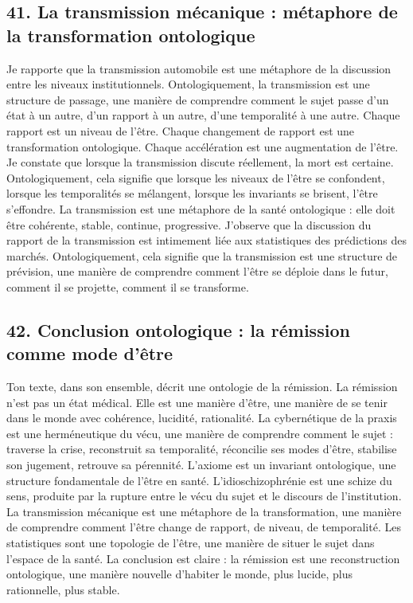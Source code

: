 \documentclass[12pt,letterpaper,oneside]{article}
\begin{document}
\subsection*{41. La transmission mécanique : métaphore de la transformation ontologique}
Je rapporte que la transmission automobile est une métaphore de la discussion entre les niveaux institutionnels. Ontologiquement, la transmission est une structure de passage, une manière de comprendre comment le sujet passe d’un état à un autre, d’un rapport à un autre, d’une temporalité à une autre.
Chaque rapport est un niveau de l’être. Chaque changement de rapport est une transformation ontologique. Chaque accélération est une augmentation de l’être.
Je constate que lorsque la transmission discute réellement, la mort est certaine. Ontologiquement, cela signifie que lorsque les niveaux de l’être se confondent, lorsque les temporalités se mélangent, lorsque les invariants se brisent, l’être s’effondre.
La transmission est une métaphore de la santé ontologique : elle doit être cohérente, stable, continue, progressive.
J’observe que la discussion du rapport de la transmission est intimement liée aux statistiques des prédictions des marchés. Ontologiquement, cela signifie que la transmission est une structure de prévision, une manière de comprendre comment l’être se déploie dans le futur, comment il se projette, comment il se transforme.

\subsection*{42. Conclusion ontologique : la rémission comme mode d’être}
Ton texte, dans son ensemble, décrit une ontologie de la rémission. La rémission n’est pas un état médical. Elle est une manière d’être, une manière de se tenir dans le monde avec cohérence, lucidité, rationalité.
La cybernétique de la praxis est une herméneutique du vécu, une manière de comprendre comment le sujet :
	traverse la crise,
	reconstruit sa temporalité,
	réconcilie ses modes d’être,
	stabilise son jugement,
	retrouve sa pérennité.
L’axiome est un invariant ontologique, une structure fondamentale de l’être en santé.
L’idioschizophrénie est une schize du sens, produite par la rupture entre le vécu du sujet et le discours de l’institution.
La transmission mécanique est une métaphore de la transformation, une manière de comprendre comment l’être change de rapport, de niveau, de temporalité.
Les statistiques sont une topologie de l’être, une manière de situer le sujet dans l’espace de la santé.
La conclusion est claire : la rémission est une reconstruction ontologique, une manière nouvelle d’habiter le monde, plus lucide, plus rationnelle, plus stable.
\end{document}
